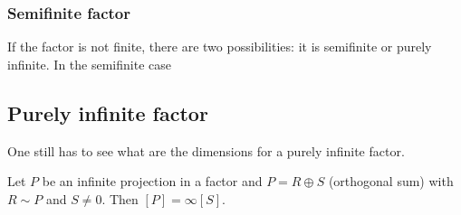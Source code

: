 					\subsubsection{Semifinite factor}

If the factor is not finite, there are two possibilities: it is semifinite or purely infinite. In the semifinite case

					\subsection{Purely infinite factor}

One still has to see what are the dimensions for a purely infinite factor.

\begin{lemma}		\label{LemORSneqzeroini}
Let $P$ be an infinite projection in a factor and $P=R\oplus S$ (orthogonal sum) with $R\sim P$ and $S\neq 0$. Then $[P]=\infty [S]$.
\end{lemma}

